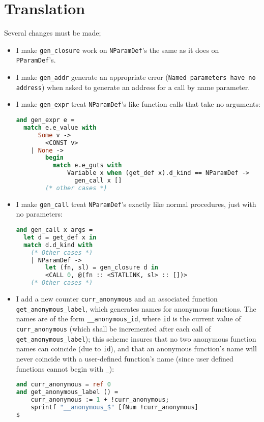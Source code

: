 \documentclass[a4paper,9pt]{article}
\begin{document}
\section{Translation}
Several changes must be made;
\begin{itemize}
    \item I make \texttt{gen\_closure} work on \texttt{NParamDef}'s the same as it does on \texttt{PParamDef}'s.
    \item I make \texttt{gen\_addr} generate an appropriate error (\texttt{Named parameters have no address}) when asked to generate an address for a call by name parameter.
    \item I make \texttt{gen\_expr} treat \texttt{NParamDef}'s like function calls that take no arguments:
\begin{lstlisting}[language=ml]
and gen_expr e =
  match e.e_value with
      Some v -> 
        <CONST v>
    | None -> 
        begin
          match e.e_guts with
              Variable x when (get_def x).d_kind == NParamDef ->
                gen_call x []
        (* other cases *)
\end{lstlisting}
    \item I make \texttt{gen\_call} treat \texttt{NParamDef}'s exactly like normal procedures, just with no parameters:
\begin{lstlisting}[language=ml]
and gen_call x args =
  let d = get_def x in
  match d.d_kind with
    (* Other cases *)
    | NParamDef ->
        let (fn, sl) = gen_closure d in
        <CALL 0, @(fn :: <STATLINK, sl> :: [])>
    (* Other cases *)
\end{lstlisting}
    \item I add a new counter \texttt{curr\_anonymous} and an associated function \texttt{get\_anonymous\_label}, which generates names for anonymous functions. The names are of the form \texttt{\_\_anonymous\_id}, where \texttt{id} is the current value of \texttt{curr\_anonymous} (which shall be incremented after each call of \texttt{get\_anonymous\_label}); this scheme insures that no two anonymous function names can coincide (due to \texttt{id}), and that an anonymous function's name will never coincide with a user-defined function's name (since user defined functions cannot begin with \texttt{\_}):
\begin{lstlisting}[language=ml]
and curr_anonymous = ref 0
and get_anonymous_label () = 
    curr_anonymous := 1 + !curr_anonymous;
    sprintf "__anonymous_$" [fNum !curr_anonymous]
$
\end{lstlisting}

\end{itemize}
\end{document}
